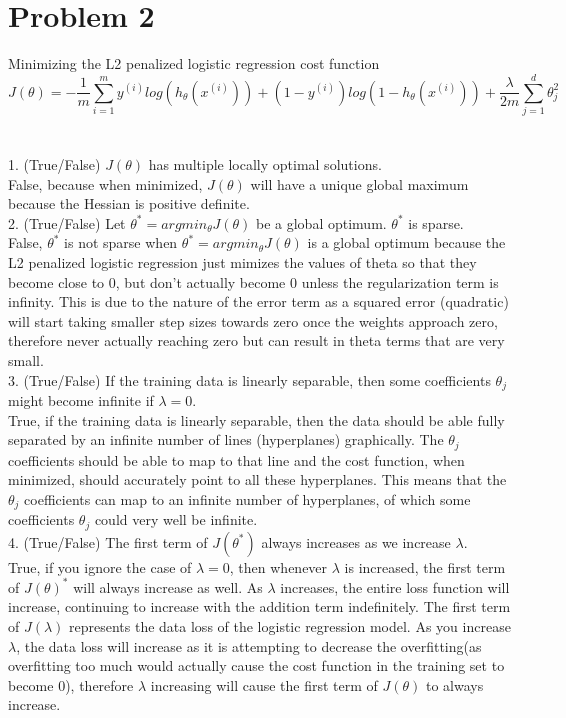 \documentclass[12pt]{article}
\begin{document}
\section*{Problem 2}
Minimizing the L2 penalized logistic regression cost function
$$J(\theta) = - \frac{1}{m}\sum_{i=1}^my^{(i)}log(h_\theta(x^{(i)})) + (1 - y^{(i)})log(1-h_\theta(x^{(i)})) + \frac{\lambda}{2m}\sum_{j=1}^d\theta_j^2$$\\
\\
1. (True/False) $J(\theta)$ has multiple locally optimal solutions.\\
False, because when minimized, $J(\theta)$ will have a unique global maximum because the Hessian is positive definite.\\

2. (True/False) Let $\theta^* = argmin_\theta J(\theta)$ be a global optimum. $\theta^*$ is sparse.\\
False, $\theta^*$ is not sparse when $\theta^* = argmin_\theta J(\theta)$ is a global optimum because the L2 penalized logistic regression just mimizes the values of theta so that they become close to 0, but don't actually become 0 unless the regularization term is infinity. This is due to the nature of the error term as a squared error (quadratic) will start taking smaller step sizes towards zero once the weights approach zero, therefore never actually reaching zero but can result in theta terms that are very small. \\

3. (True/False) If the training data is linearly separable, then some coefficients $\theta_j$ might become infinite if $\lambda = 0$.\\
True, if the training data is linearly separable, then the data should be able fully separated by an infinite number of lines (hyperplanes) graphically. The $\theta_j$ coefficients should be able to map to that line and the cost function, when minimized, should accurately point to all these hyperplanes. This means that the $\theta_j$  coefficients can map to an infinite number of hyperplanes, of which some coefficients $\theta_j$ could very well be infinite.\\

4. (True/False) The first term of $J(\theta^*)$ always increases as we increase $\lambda$.\\
True, if you ignore the case of $\lambda = 0$, then whenever $\lambda$ is increased, the first term of $J(\theta)^*$ will always increase as well. As $\lambda$ increases, the entire loss function will increase, continuing to increase with the addition term indefinitely. The first term of $J(\lambda)$ represents the data loss of the logistic regression model. As you increase $\lambda$, the data loss will increase as it is attempting to decrease the overfitting(as overfitting too much would actually cause the cost function in the training set to become 0), therefore $\lambda$ increasing will cause the first term of $J(\theta)$ to always increase.\\
\end{document}
